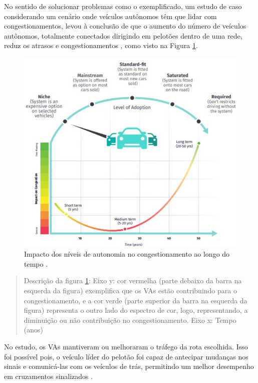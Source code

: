 No sentido de solucionar problemas como o exemplificado, um estudo de caso considerando um cenário onde veículos autônomos têm que lidar com congestionamentos, levou à conclusão de que o aumento do número de veículos autônomos, totalmente conectados dirigindo em pelotões dentro de uma rede, reduz os atrasos e congestionamentos \cite{conge}, como visto na Figura \ref{congestionamento}. 

\begin{figure}[H]
\centering
\includegraphics[width=15cm]{Figures/conge.jpg}
\caption{Impacto dos níveis de autonomia no congestionamento ao longo do tempo \cite{4cenarios_ocidental}.}
\label{congestionamento}
\end{figure}
\begin{quote}
Descrição da figura \ref{congestionamento}: Eixo y: cor vermelha (parte debaixo da barra na esquerda da figura) exemplifica que os VAs estão contribuindo para o congestionamento, e a cor verde (parte superior da barra na esquerda da figura) representa o outro lado do espectro de cor, logo, representando, a diminuição ou não contribuição no congestionamento. Eixo x: Tempo (anos)

\end{quote}

No estudo, os VAs mantiveram ou melhoraram o tráfego da rota escolhida. Isso foi possível pois, o veículo líder do pelotão foi capaz de antecipar mudanças nos sinais e comunicá-las com os veículos de trás, permitindo um melhor desempenho em cruzamentos sinalizados \cite{conge}.

